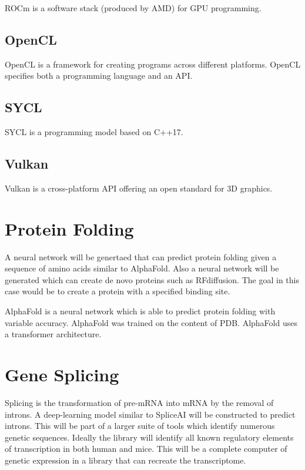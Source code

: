 \documentclass{report}
\begin{document}
ROCm is a software stack (produced by AMD) for GPU programming.

\section{OpenCL}

OpenCL is a framework for creating programs across different platforms. OpenCL specifies both a programming language and an API.

\section{SYCL}

SYCL is a programming model based on C++17.

\section{Vulkan}

Vulkan is a cross-platform API offering an open standard for 3D graphics.

\chapter{Protein Folding}

A neural network will be genertaed that can predict protein folding given a sequence of amino acids similar to AlphaFold. Also a neural network will be generated which can create de novo proteins such as RFdiffusion. The goal in this case would be to create a protein with a specified binding site.

AlphaFold is a neural network which is able to predict protein folding with variable accuracy. AlphaFold was trained on the content of PDB. AlphaFold uses a transformer architecture.

\chapter{Gene Splicing}

Splicing is the transformation of pre-mRNA into mRNA by the removal of introns. A deep-learning model similar to SpliceAI will be constructed to predict introns. This will be part of a larger suite of tools which identify numerous genetic sequences. Ideally the library will identify all known regulatory elements of transcription in both human and mice. This will be a complete computer of genetic expression in a library that can recreate the transcriptome.
\end{document}
